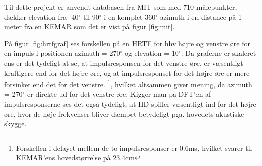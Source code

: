 Til dette projekt er anvendt databasen fra MIT \cite{MIT} som med 710 målepunkter, dækker elevation fra -40$^\circ$ til 90$^\circ$ i en komplet 360$^\circ$ azimuth i en distance på 1 meter fra en KEMAR som det er vist på figur \ref{fig:mit}.


På figur \ref{fig:hrtfgraf} ses forskellen på en HRTF for hhv højre og venstre øre for en impuls i positionen azimuth = 270$^\circ$ og elevation = 10$^\circ$. Da graferne er skaleret ens er det tydeligt at se, at impulsresponsen for det venstre øre, er væsentligt kraftigere end for det højre øre, og at impulsresponset for det højre øre er mere forsinket end det for det venstre. \footnote{Forskellen i delayet mellem de to impulsresponser er 0.6ms, hvilket svarer til KEMAR'ens hovedstørrelse på 23.4cm}, hvilket altsammen giver mening, da azimuth = 270$^\circ$ er direkte ud for det venstre øre. Kigger man på DFT'en af impulsresponserne ses det også tydeligt, at IID spiller væsentligt ind for det højre øre, hvor de høje frekvenser bliver dæmpet betydeligt pga. hovedets akustiske skygge.


